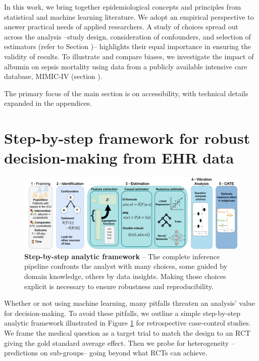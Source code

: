 \documentclass[10pt,letterpaper]{article}
\begin{document}
In this work, we bring together epidemiological concepts and
principles from statistical and machine learning literature. We adopt
an empirical perspective to answer practical needs of applied researchers.
A study of choices spread out across the analysis
--study design, consideration of
confounders, and selection of estimators (refer to Section
)-- highlights their equal importance in ensuring
the validity of results. To illustrate and compare biases, we investigate
the impact of albumin on sepsis mortality using data from a publicly available
intensive care database, MIMIC-IV \cite{johnson2020mimic} (section
).

The primary focus of the main section is on accessibility, with technical
details expanded in the appendices.

%
\section*{Step-by-step framework for robust decision-making from EHR data}\label{sec:inference_flow}

\begin{figure}[t!]
  \centering
  \includegraphics[width=0.9\linewidth]{img_main/complete_inference_flow.pdf}
  \caption{\textbf{Step-by-step analytic framework} -- The complete
    inference pipeline confronts the analyst with
    many choices, some guided by domain knowledge, others
    by data insights. Making those choices explicit is necessary to ensure
    robustness and reproducibility.}\label{fig:inference_framework}
\end{figure}



Whether or not using machine learning, many pitfalls threaten an analysis'
value for decision-making. To avoid these pitfalls, we outline a simple
step-by-step analytic framework illustrated in Figure
\ref{fig:inference_framework} for retrospective case-control studies. We frame
the medical question as a target trial \cite{hernan2021methods} to match the
design to an RCT giving the gold standard average effect. Then we probe for
heterogeneity --predictions on sub-groups--  going beyond what RCTs can
achieve.
\end{document}
